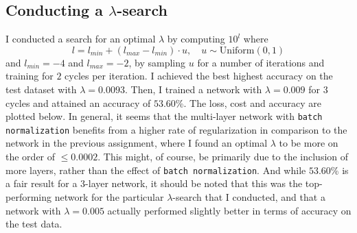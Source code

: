 \documentclass{article}
\begin{document}
\subsection*{Conducting a $\lambda$-search}
	I conducted a search for an optimal $\lambda$ by computing $10^l$ where
	$$l = l_{min} + (l_{max} - l_{min}) \cdot u, \quad u\sim\text{Uniform}(0, 1)$$
	and $l_{min} = -4$ and $l_{max} = -2$, by sampling $u$ for a number of iterations and training for $2$ cycles per iteration. I achieved the best highest accuracy on the test dataset with $\lambda = 0.0093$. Then, I trained a network with $\lambda = 0.009$ for $3$ cycles and attained an accuracy of $53.60$\%. The loss, cost and accuracy are plotted below. In general, it seems that the multi-layer network with \texttt{batch normalization} benefits from a higher rate of regularization in comparison to the network in the previous assignment, where I found an optimal $\lambda$ to be more on the order of $\leq 0.0002$. This might, of course, be primarily due to the inclusion of more layers, rather than the effect of \texttt{batch normalization}. And while $53.60$\% is a fair result for a $3$-layer network, it should be noted that this was the top-performing network for the particular $\lambda$-search that I conducted, and that a network with $\lambda = 0.005$ actually performed slightly better in terms of accuracy on the test data.
\end{document}
